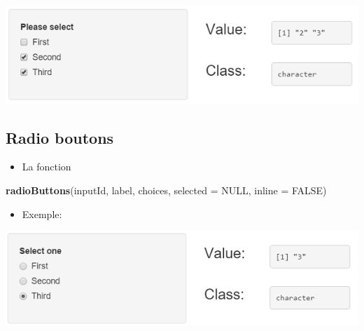 \documentclass[]{article}
\newenvironment{Shaded}{\begin{snugshade}}{\end{snugshade}}
\newcommand{\KeywordTok}[1]{\textcolor[rgb]{0.13,0.29,0.53}{\textbf{#1}}}
\newcommand{\DataTypeTok}[1]{\textcolor[rgb]{0.13,0.29,0.53}{#1}}
\newcommand{\DecValTok}[1]{\textcolor[rgb]{0.00,0.00,0.81}{#1}}
\newcommand{\StringTok}[1]{\textcolor[rgb]{0.31,0.60,0.02}{#1}}
\newcommand{\CommentTok}[1]{\textcolor[rgb]{0.56,0.35,0.01}{\textit{#1}}}
\newcommand{\OtherTok}[1]{\textcolor[rgb]{0.56,0.35,0.01}{#1}}
\newcommand{\NormalTok}[1]{#1}
\providecommand{\tightlist}{%
  \setlength{\itemsep}{0pt}\setlength{\parskip}{0pt}}
\begin{document}
\includegraphics{img/multiple_checkbox.png}

\subsection{Radio boutons}\label{radio-boutons}

\begin{itemize}
\tightlist
\item
  La fonction
\end{itemize}

\begin{Shaded}
\begin{Highlighting}[]
\KeywordTok{radioButtons}\NormalTok{(inputId, label, choices, }\DataTypeTok{selected =} \OtherTok{NULL}\NormalTok{, }\DataTypeTok{inline =} \OtherTok{FALSE}\NormalTok{)}
\end{Highlighting}
\end{Shaded}

\begin{itemize}
\tightlist
\item
  Exemple:
\end{itemize}

\begin{Shaded}
\end{Shaded}

\includegraphics{img/radio.png}
\end{document}
